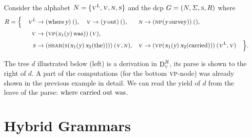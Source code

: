 \documentclass[../document.tex]{subfiles}
\begin{document}
    \begin{example}
        Consider the alphabet \(N = \{\textsc{\textsl{v}}^{\textsc{\textsl{L}}}, \textsc{\textsl{v}}, \textsc{\textsl{n}}, \textsc{\textsl{s}} \}\) and the \gls*{dcp} \(G = (N, \varSigma, \textsc{\textsl{s}}, R)\) where
        \begin{align*}
            R = \Big\{ \quad
            \textsc{\textsl{v}}^{\textsc{\textsl{L}}} &\to (\text{where} \, \textsl{y})\:(),
            \quad \textsc{\textsl{v}} \to (\textsl{y} \, \text{out})\:(),
            &\textsc{\textsl{n}} &\to (\textsc{np} (\textsl{y} \, \text{survey}))\:(), \\
            \textsc{\textsl{v}} &\to (\textsc{vp}(\textsl{x}_1(\textsl{y}) \, \text{was}))\:(\textsc{\textsl{v}}),  \\
            \textsc{\textsl{s}} &\to (\textsc{sbar} (\textsc{s} (\textsl{x}_1(\textsl{y}) \, \textsl{x}_2(\text{the}))))\:(\textsc{\textsl{v}}, \textsc{\textsl{n}}),
            &\textsc{\textsl{v}} &\to (\textsc{vp}(\textsl{x}_1(\textsl{y}) \, \textsl{x}_2(\text{carried})))\:(\textsc{\textsl{v}}^{\textsc{\textsl{L}}}, \textsc{\textsl{v}})
            \quad \Big\} \text{.}
        \end{align*}

        The tree \(d\) illustrated below (left) is a derivation in \(\operatorname{D}^R_{\textsc{\textsl{v}}}\), its parse is shown to the right of \(d\).
        A part of the computations (for the bottom \(\textsc{vp}\)-node) was already shown in the previous example in detail.
        We can read the yield of \(d\) from the leave of the parse: \(\text{where carried out was}\).

        \null\hfill
        \hfill
        \hfill\null
    \end{example}

    \section{Hybrid Grammars}

    \ifSubfilesClassLoaded{%
        \printunsrtglossaries
    }{}
\end{document}
